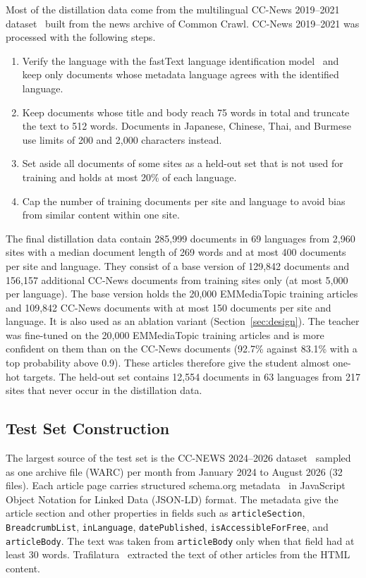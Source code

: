 \documentclass{ieeeaccess}
\begin{document}
Most of the distillation data come from the multilingual CC-News 2019--2021 dataset~\cite{cloversearch_ccnews} built from the news archive of Common Crawl. CC-News 2019--2021 was processed with the following steps.
\begin{enumerate}
  \item Verify the language with the fastText language identification model~\cite{joulin2017bag} and keep only documents whose metadata language agrees with the identified language.
  \item Keep documents whose title and body reach 75 words in total and truncate the text to 512 words. Documents in Japanese, Chinese, Thai, and Burmese use limits of 200 and 2,000 characters instead.
  \item Set aside all documents of some sites as a held-out set that is not used for training and holds at most 20\% of each language.
  \item Cap the number of training documents per site and language to avoid bias from similar content within one site.
\end{enumerate}
The final distillation data contain 285,999 documents in 69 languages from 2,960 sites with a median document length of 269 words and at most 400 documents per site and language. They consist of a base version of 129,842 documents and 156,157 additional CC-News documents from training sites only (at most 5,000 per language). The base version holds the 20,000 EMMediaTopic training articles and 109,842 CC-News documents with at most 150 documents per site and language. It is also used as an ablation variant (Section~\ref{sec:design}). The teacher was fine-tuned on the 20,000 EMMediaTopic training articles and is more confident on them than on the CC-News documents (92.7\% against 83.1\% with a top probability above 0.9). These articles therefore give the student almost one-hot targets. The held-out set contains 12,554 documents in 63 languages from 217 sites that never occur in the distillation data.

\subsection{Test Set Construction}
\label{sec:testset}
The largest source of the test set is the CC-NEWS 2024--2026 dataset~\cite{commoncrawl2026ccnews} sampled as one archive file (WARC) per month from January 2024 to August 2026 (32 files). Each article page carries structured schema.org metadata~\cite{guha2016schema} in JavaScript Object Notation for Linked Data (JSON-LD) format. The metadata give the article section and other properties in fields such as \texttt{articleSection}, \texttt{BreadcrumbList}, \texttt{inLanguage}, \texttt{datePublished}, \texttt{isAccessibleForFree}, and \texttt{articleBody}. The text was taken from \texttt{articleBody} only when that field had at least 30 words. Trafilatura~\cite{barbaresi2021trafilatura} extracted the text of other articles from the HTML content.
\end{document}
